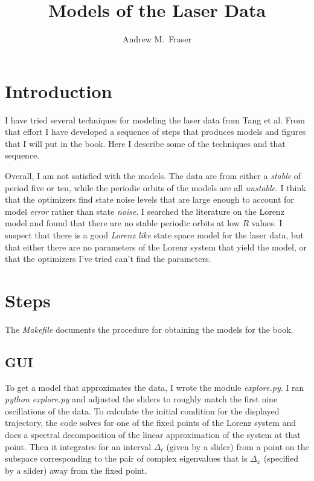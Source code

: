 \documentclass[12pt]{article}
\title{Models of the Laser Data}
\author{Andrew M.\ Fraser}
\begin{document}
\maketitle

\section{Introduction}
\label{sec:introduction}

I have tried several techniques for modeling the laser data from Tang
et al.  From that effort I have developed a sequence of steps that
produces models and figures that I will put in the book.  Here I
describe some of the techniques and that sequence.

Overall, I am not satisfied with the models.  The data are from either
a \emph{stable} of period five or ten, while the periodic orbits of
the models are all \emph{unstable}.  I think that the optimizers find
state noise levels that are large enough to account for model
\emph{error} rather than state \emph{noise}.  I searched the
literature on the Lorenz model and found that there are no stable
periodic orbits at low $R$ values.  I suspect that there is a good
\emph{Lorenz like} state space model for the laser data, but that
either there are no parameters of the Lorenz system that yield the
model, or that the optimizers I've tried can't find the parameters.

\section{Steps}
\label{sec:steps}

The \emph{Makefile} documents the procedure for obtaining the models
for the book.

\subsection{GUI}
\label{sec:gui}

To get a model that approximates the data, I wrote the module
\emph{explore.py}.  I ran \emph{python explore.py} and adjusted the
sliders to roughly match the first nine oscillations of the data.  To
calculate the initial condition for the displayed trajectory, the code
solves for one of the fixed points of the Lorenz system and does a
spectral decomposition of the linear approximation of the system at
that point.  Then it integrates for an interval $\Delta_t$ (given by a
slider) from a point on the subspace corresponding to the pair of
complex eigenvalues that is $\Delta_x$ (specified by a slider) away
from the fixed point.
\end{document}
